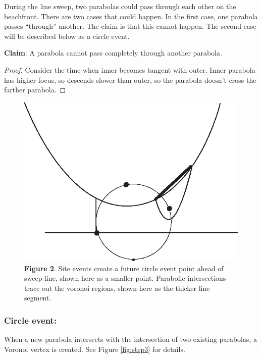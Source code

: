 \documentclass{article}
\begin{document}
During the line sweep, two parabolas could pass through each other on the beachfront. There are two cases that could happen. In the first case, one parabola passes ``through'' another. The claim is that this cannot happen. The second case will be described below as a circle event.

\textbf{Claim}:
A parabola cannot pass completely through another parabola.
\begin{proof}
    Consider the time when inner becomes tangent with outer. Inner parabola has higher focus, so descends slower than outer, so the parabola doesn't cross the farther parabola.
\end{proof}

\begin{figure}[h]
\begin{center}
 \includegraphics{voronoistep2.jpg}
 \caption{\textbf{Figure 2}. Site events create a future circle event point ahead of sweep line, shown here as a smaller point. Parabolic intersections trace out the voronoi regions, shown here as the thicker line segment.}
\label{fig:step2}
\end{center}
\end{figure}

\subsubsection{Circle event:}

When a new parabola intersects with the intersection of two existing parabolas, a Voronoi vertex is created. See Figure \ref{fig:step3} for details.
\end{document}
